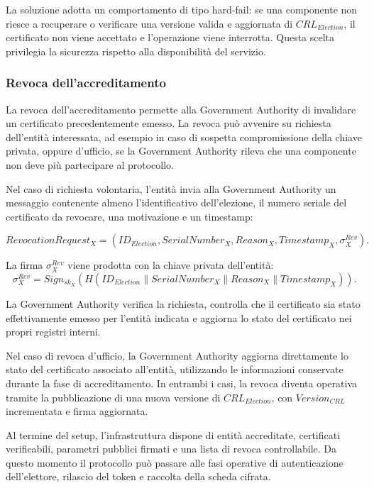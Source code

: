 \documentclass[a4paper,12pt]{article}
\begin{document}
La soluzione adotta un comportamento di tipo hard-fail: se una componente non riesce a recuperare o verificare una versione valida e aggiornata di \(CRL_{Election}\), il certificato non viene accettato e l'operazione viene interrotta. 
Questa scelta privilegia la sicurezza rispetto alla disponibilit\`a del servizio.

\subsubsection{Revoca dell'accreditamento}

La revoca dell'accreditamento permette alla Government Authority di invalidare un certificato precedentemente emesso. 
La revoca pu\`o avvenire su richiesta dell'entit\`a interessata, ad esempio in caso di sospetta compromissione della chiave privata, oppure d'ufficio, se la Government Authority rileva che una componente non deve pi\`u partecipare al protocollo.

Nel caso di richiesta volontaria, l'entit\`a invia alla Government Authority un messaggio contenente almeno l'identificativo dell'elezione, il numero seriale del certificato da revocare, una motivazione e un timestamp:

\[
	RevocationRequest_X =
	(ID_{Election}, SerialNumber_X, Reason_X, Timestamp_X, \sigma_X^{Rev}).
\]

La firma \(\sigma_X^{Rev}\) viene prodotta con la chiave privata dell'entit\`a:
\[
	\sigma_X^{Rev} =
	Sign_{sk_X}(H(ID_{Election} \parallel SerialNumber_X \parallel Reason_X \parallel Timestamp_X)).
\]

La Government Authority verifica la richiesta, controlla che il certificato sia stato effettivamente emesso per l'entit\`a indicata e aggiorna lo stato del certificato nei propri registri interni.

Nel caso di revoca d'ufficio, la Government Authority aggiorna direttamente lo stato del certificato associato all'entit\`a, utilizzando le informazioni conservate durante la fase di accreditamento. 
In entrambi i casi, la revoca diventa operativa tramite la pubblicazione di una nuova versione di \(CRL_{Election}\), con \(Version_{CRL}\) incrementata e firma aggiornata.

Al termine del setup, l'infrastruttura dispone di entit\`a accreditate, certificati verificabili, parametri pubblici firmati e una lista di revoca controllabile. 
Da questo momento il protocollo pu\`o passare alle fasi operative di autenticazione dell'elettore, rilascio del token e raccolta della scheda cifrata.
\end{document}
